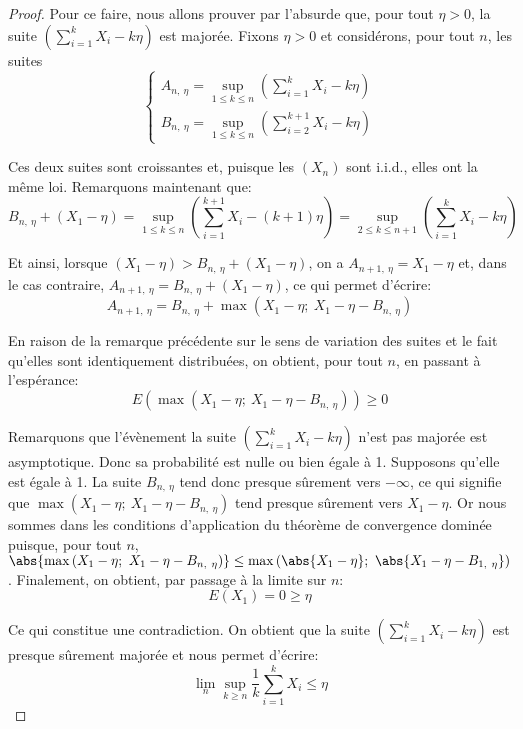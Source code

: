\begin{proof}
\medskip
Pour ce faire, nous allons prouver par l'absurde que, pour tout $\eta > 0$, la suite $\left (\displaystyle{\sum_{i=1}^k} X_i - k \eta\right )$ est majorée. Fixons $\eta > 0$ et considérons, pour tout $n$, les suites
\[
\begin{cases}
A_{n,~\eta} = \sup \limits_{1 \leq k \leq n} \left (\displaystyle{\sum_{i=1}^k} X_i - k \eta \right ) \\
B_{n,~\eta} = \sup \limits_{1 \leq k \leq n} \left (\displaystyle{\sum_{i=2}^{k+1}} X_i - k \eta\right ) 
\end{cases}
\]

Ces deux suites sont croissantes et, puisque les $(X_n)$ sont i.i.d., elles ont la même loi. Remarquons maintenant que:
\[
B_{n,~\eta} + (X_1 - \eta) = \sup \limits_{1 \leq k \leq n} \left (\displaystyle{\sum_{i=1}^{k+1}} X_i - (k+1) \eta\right ) = \sup \limits_{2 \leq k \leq n+1} \left (\displaystyle{\sum_{i=1}^k} X_i - k \eta \right )
\]

Et ainsi, lorsque $(X_1 - \eta) > B_{n,~\eta} + (X_1 - \eta)$, on a $A_{n+1,~\eta} = X_1 - \eta$ et, dans le cas contraire, $A_{n+1,~\eta} = B_{n,~\eta} + (X_1 - \eta)$, ce qui permet d'écrire:
\[
A_{n+1,~\eta} = B_{n,~\eta} + \max \left ( X_1 - \eta;~ X_1 - \eta - B_{n,~\eta} \right )
\]

En raison de la remarque précédente sur le sens de variation des suites et le fait qu'elles sont identiquement distribuées, on obtient, pour tout $n$, en passant à l'espérance:
\[
E\left (\max \left ( X_1 - \eta;~ X_1 - \eta - B_{n,~\eta} \right ) \right ) \geq 0
\]

Remarquons que l'évènement \og la suite $\left (\displaystyle{\sum_{i=1}^k} X_i - k \eta\right )$ n'est pas majorée \fg{} est asymptotique. Donc sa probabilité est nulle ou bien égale à 1. Supposons qu'elle est égale à 1. La suite $B_{n,~\eta}$ tend donc presque sûrement vers $-\infty$, ce qui signifie que $\max \left ( X_1 - \eta;~ X_1 - \eta - B_{n,~\eta} \right )$ tend presque sûrement vers $X_1 - \eta$. Or nous sommes dans les conditions d'application du théorème de convergence dominée puisque, pour tout $n$, $\abs{\max \left ( X_1 - \eta;~ X_1 - \eta - B_{n,~\eta} \right )} \leq \max \left ( \abs{X_1-\eta};~ \abs{X_1 - \eta - B_{1,~\eta}}\right )$. Finalement, on obtient, par passage à la limite sur $n$:
\[
E(X_1) =  0 \geq \eta
\]

Ce qui constitue une contradiction. On obtient que la suite  $\left (\displaystyle{\sum_{i=1}^k} X_i - k \eta\right )$ est presque sûrement majorée et nous permet d'écrire:
\[
\lim  \limits_{n} \sup \limits_{k \geq n} \frac{1}{k} \displaystyle{\sum_{i=1}^k} X_i \leq \eta
\]


\end{proof}
